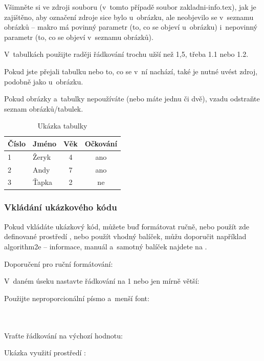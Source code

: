 Všimněte si ve zdroji souboru (v~tomto případě soubor zakladni-info.tex), jak je zajištěno, aby označení zdroje sice bylo u~obrázku, ale neobjevilo se v~seznamu obrázků -- makro  má povinný parametr (to, co se objeví u~obrázku) i~nepovinný parametr (to, co se objeví v~seznamu obrázků).

V~tabulkách použijte raději řádkování trochu užší než 1,5, třeba 1.1 nebo 1.2.

Pokud jste přejali tabulku nebo to, co se v~ní nachází, také je nutné uvést zdroj, podobně jako u~obrázku.

Pokud obrázky a~tabulky nepoužíváte (nebo máte jednu či dvě), vzadu odstraňte seznam obrázků/tabulek.


\begin{table}[htb]
	\centering
	\caption{Ukázka tabulky}
	\medskip
	\radkovani[1.2]
		\begin{tabular}{@{}l||l|c|c@{}}\hline
			\textbf{Číslo} & \textbf{Jméno} & \textbf{Věk} & \textbf{Očkování}\\ \hline\hline
			1	&Žeryk&	4	&ano\\ \hline
			2	&Andy&	7	&ano\\ \hline
			3	&Ťapka&	2	&ne\\ \hline			
		\end{tabular}
	\label{tab:ukazkatabulky}
\end{table}


\subsubsection{Vkládání ukázkového kódu}

Pokud vkládáte ukázkový kód, můžete buď formátovat ručně, nebo použít zde definované prostředí , nebo použít vhodný balíček, můžu doporučit například algorithm2e -- informace, manuál a~samotný balíček najdete na \cite{algorithm2e}.

Doporučení pro ruční formátování:
\begin{citemize}
	\item V~daném úseku nastavte řádkování na 1 nebo jen mírně větší:\\	
	
	\item Použijte neproporcionální písmo a~menší font:\\	
	\\[-2pt]
	\\[-2pt]
	\ttsmall{\}}
	\item Vraťte řádkování na výchozí hodnotu:\\	
\end{citemize}
Ukázka využití prostředí :

